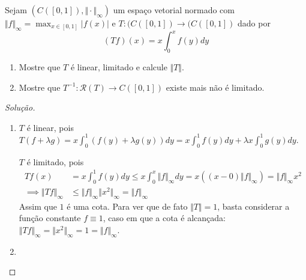 \documentclass{article}
\theoremstyle{definition}
\numberwithin{equation}{section}
\begin{document}
\begin{exer}
	Sejam $(C([0,1]),\Vert\cdot\Vert_\infty)$ um espaço vetorial normado com $\Vert f\Vert_\infty=\max_{x\in[0,1]}|f(x)|$ e $T:(C([0,1])\to (C([0,1])$ dado por
	\[(Tf)(x)=x\int_0^xf(y)dy\]
	\begin{enumerate}
		\item Mostre que $T$ é linear, limitado e calcule $\Vert T\Vert$.
		\item Mostre que $T^{-1}:\mathcal{R}(T)\to C([0,1])$ existe mais não é limitado.
	\end{enumerate}
\end{exer}
\begin{proof}[Solução]\leavevmode
	\begin{enumerate}
		\item $T$ é linear, pois $T(f+\lambda g)=x\int_0^1(f(y)+\lambda g(y))dy=x\int_0^1f(y)dy+\lambda x\int_0^1g(y)dy$.
	
	$T$ é limitado, pois
	\begin{align*}
		Tf(x)&=x\int_0^1f(y)dy\leq x\int_0^x\Vert f\Vert_\infty dy= x\left((x-0)\Vert f\Vert_\infty\right)=\Vert f\Vert_\infty x^2\\
		\implies
		\Vert Tf\Vert_\infty&\leq \Vert f\Vert_\infty \Vert x^2\Vert_\infty=\Vert f\Vert_\infty
	\end{align*}
	Assim que $1$ é uma cota. Para ver que de fato $\Vert T\Vert=1$, basta considerar a função constante $f\equiv1$, caso em que a cota é alcançada: $\Vert Tf\Vert_\infty=\Vert x^2\Vert_\infty=1=\Vert f\Vert_\infty$.
	
	\item 
	\end{enumerate}
\end{proof}
\fi
\end{document}

